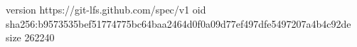 version https://git-lfs.github.com/spec/v1
oid sha256:b9573535bef51774775bc64baa2464d0f0a09d77ef497dfe5497207a4b4c92de
size 262240
